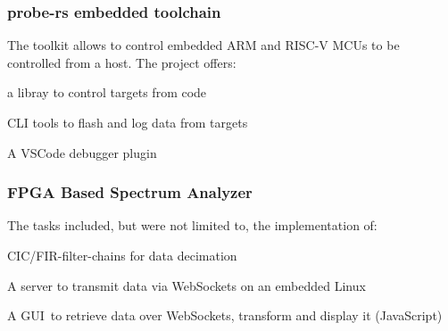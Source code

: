 \begin{timeline}
    \subsubsection{probe-rs embedded toolchain}
    The toolkit allows to control embedded ARM and RISC-V MCUs to be controlled from a host.
    The project offers:\\
    \begin{tightemize}
    \item a libray to control targets from code
    \item CLI tools to flash and log data from targets
    \item A VSCode debugger plugin
    \end{tightemize}
    \sectionsep
    
    \subsubsection{FPGA Based Spectrum Analyzer}
    The tasks included, but were not limited to, the implementation of:
    \begin{tightemize}
    \item CIC/FIR-filter-chains for data decimation
    \item A server to transmit data via WebSockets on an embedded Linux
    \item A GUI to retrieve data over WebSockets, transform and display it (JavaScript)
    \end{tightemize}
    \sectionsep
    

    \end{timeline}%